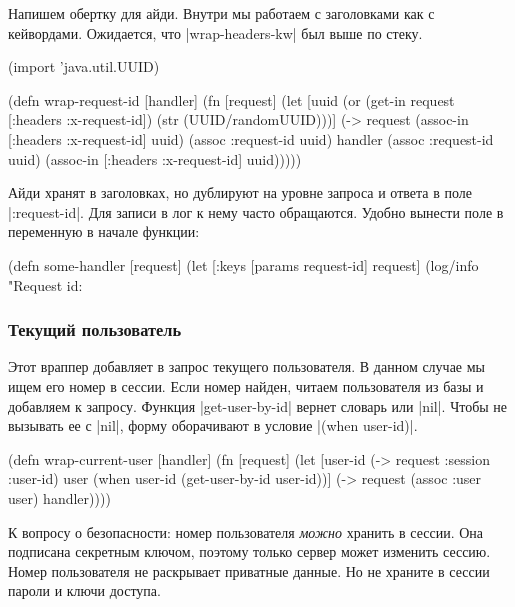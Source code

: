 Напишем обертку для айди. Внутри мы работаем с заголовками как с
кейвордами. Ожидается, что \spverb|wrap-headers-kw| был выше по стеку.

\begin{english}
  \begin{clojure}
(import 'java.util.UUID)

(defn wrap-request-id [handler]
  (fn [request]
    (let [uuid (or (get-in request [:headers :x-request-id])
                   (str (UUID/randomUUID)))]
      (-> request
          (assoc-in [:headers :x-request-id] uuid)
          (assoc :request-id uuid)
          handler
          (assoc :request-id uuid)
          (assoc-in [:headers :x-request-id] uuid)))))
  \end{clojure}
\end{english}

Айди хранят в заголовках, но дублируют на уровне запроса и ответа в поле
\spverb|:request-id|. Для записи в лог к нему часто обращаются. Удобно вынести
поле в переменную в начале функции:

\begin{english}
  \begin{clojure}
(defn some-handler [request]
  (let [{:keys [params request-id]} request]
    (log/info "Request id: %
  \end{clojure}
\end{english}

\subsubsection*{Текущий пользователь}

Этот враппер добавляет в запрос текущего пользователя. В данном случае мы ищем
его номер в сессии. Если номер найден, читаем пользователя из базы и добавляем к
запросу. Функция \spverb|get-user-by-id| вернет словарь или \spverb|nil|. Чтобы
не вызывать ее с \spverb|nil|, форму оборачивают в условие \spverb|(when user-id)|.

\begin{english}
  \begin{clojure}
(defn wrap-current-user [handler]
  (fn [request]
    (let [user-id (-> request :session :user-id)
          user (when user-id
                 (get-user-by-id user-id))]
      (-> request
          (assoc :user user)
          handler))))
  \end{clojure}
\end{english}

К вопросу о безопасности: номер пользователя \emph{можно} хранить в сессии. Она
подписана секретным ключом, поэтому только сервер может изменить сессию. Номер
пользователя не раскрывает приватные данные. Но не храните в сессии пароли и
ключи доступа.

